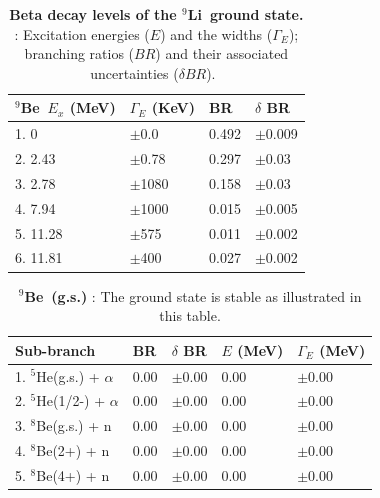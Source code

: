 \documentclass{JINST}
\newcommand{\li}{$^{9}$Li~}
\newcommand{\beNINE}{$^{9}$Be~}
\begin{document}
 


\begin{table}[tb]
\caption{\label{tab:betaStates} {\bf Beta decay levels of the \li ground state. 
}: Excitation energies ($E$) and the widths ($\Gamma_E$); branching ratios
($BR$) and their associated uncertainties ($\delta BR $).~\cite{Tilley2004155}}
\begin{center}
\begin{small}
\begin{tabular}{l l l l }
\hline
\hline
\beNINE $E_x$ (MeV) & $\Gamma_E$ (KeV)& BR & $\delta$ BR   \\
\hline
1. 0 & $\pm$0.0& 0.492 & $\pm$0.009   \\ 
2. 2.43& $\pm$0.78 & 0.297 & $\pm$0.03   \\
3. 2.78  & $\pm$1080& 0.158 & $\pm$0.03   \\
4. 7.94 & $\pm$1000 & 0.015 & $\pm$0.005   \\
5. 11.28 & $\pm$575 & 0.011 & $\pm$0.002   \\
6. 11.81 & $\pm$400 & 0.027 & $\pm$0.002   \\
\hline
\hline
\end{tabular}
\end{small}
\end{center}
\end{table}



\begin{table}[tb]

\caption{\label{tabgs} {\bf \beNINE (g.s.) }: The ground state is stable as illustrated in this table.}

\begin{center}
\begin{small}
\begin{tabular}{l l l l l}
\hline
\hline
Sub-branch & BR & $\delta$ BR & $E$ (MeV) & $\Gamma_E$ (MeV) \\
\hline
1. $^{5}$He(g.s.) + $\alpha$ & 0.00 & $\pm$0.00 & 0.00 & $\pm$0.00 \\ 
2. $^{5}$He(1/2-) + $\alpha$ & 0.00 & $\pm$0.00 & 0.00 & $\pm$0.00 \\
3. $^{8}$Be(g.s.) + n & 0.00 & $\pm$0.00 & 0.00 & $\pm$0.00 \\
4. $^{8}$Be(2+) + n  & 0.00 & $\pm$0.00 & 0.00 & $\pm$0.00 \\
5. $^{8}$Be(4+) + n & 0.00 & $\pm$0.00  &  0.00 & $\pm$0.00 \\
\hline
\hline
\end{tabular}
\end{small}
\end{center}
\end{table}
\end{document}
